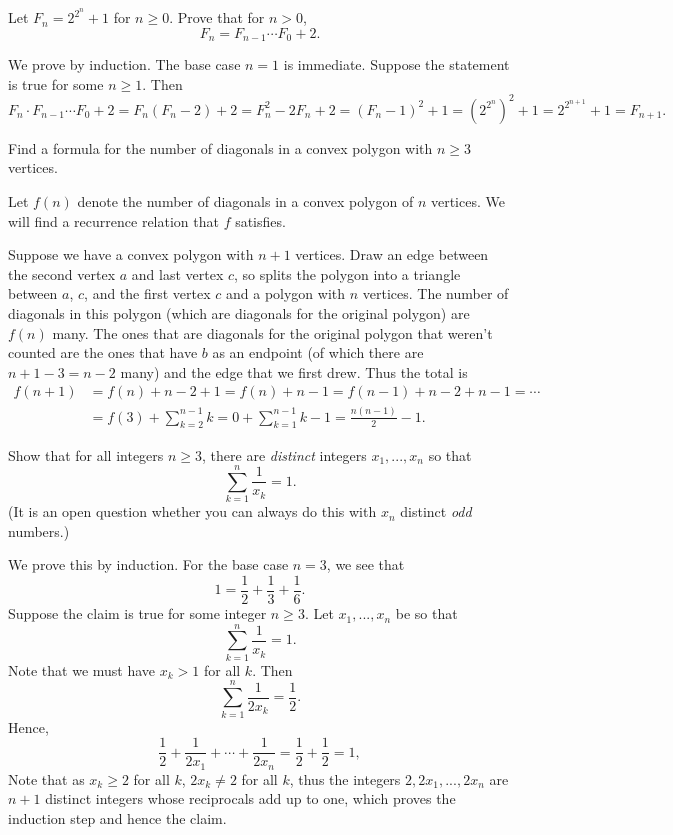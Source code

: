 \documentclass[11pt,dvipsnames]{book}
\numberwithin{equation}{section} %
\numberwithin{figure}{section} %
\numberwithin{table}{section} %
\begin{document}
\begin{exercise}
Let $F_{n}=2^{2^{n}}+1$ for $n\geq 0$. Prove that for $n>0$,
\[
F_{n} = F_{n-1}\cdots F_{0}+2.
\]
\begin{solution}
We prove by induction. The base case $n=1$ is immediate. Suppose the statement is true for some $n\geq 1$. Then
\[
F_{n}\cdot F_{n-1}\cdots F_{0}+2
= F_{n}(F_{n}-2)+2 
=F_{n}^{2}-2F_{n}+2
=(F_{n}-1)^2+1
=(2^{2^{n}})^2+1 = 2^{2^{n+1}}+1 =F_{n+1}.
\]
\end{solution}
\end{exercise}

\begin{exercise}
Find a formula for the number of diagonals in a convex polygon with $n\geq 3$ vertices. 
\begin{solution}
Let $f(n)$ denote the number of diagonals in a convex polygon of $n$ vertices. We will find a recurrence relation that $f$ satisfies. 

Suppose we have a convex  polygon with $n+1$ vertices. Draw an edge between the second vertex $a$ and last vertex $c$, so splits the polygon into a triangle between $a$, $c$, and the first vertex $c$ and a polygon with $n$ vertices. The number of diagonals in this polygon (which are diagonals for the original polygon) are $f(n)$ many. The ones that are diagonals for the original polygon that weren't counted are the ones that have $b$ as an endpoint (of which there are $n+1-3=n-2$ many) and the edge that we first drew. Thus the total is
\begin{align*}
f(n+1)
& =f(n)+n-2+1=f(n)+n-1  = f(n-1) + n-2+n-1=\cdots \\
& = f(3) + \sum_{k=2}^{n-1}k
=0+\sum_{k=1}^{n-1}k-1 = \frac{n(n-1)}{2}-1. 
\end{align*}
\end{solution}
\end{exercise}

\begin{exercise}
Show that for all integers $n\geq 3$, there are {\it distinct} integers $x_{1},...,x_{n}$ so that 
\[
\sum_{k=1}^{n} \frac{1}{x_{k}}=1.
\]
(It is an open question whether you can always do this with $x_{n}$ distinct {\it odd} numbers.)
\begin{solution}
We prove this by induction. For the base case $n=3$, we see that
\[
1=\frac{1}{2}+\frac{1}{3}+\frac{1}{6}.
\]
 Suppose the claim is true for some integer $n\geq 3$. Let $x_{1},...,x_{n}$ be so that 
\[
\sum_{k=1}^{n} \frac{1}{x_{k}}=1.
\]
Note that we must have $x_{k}>1$ for all $k$. Then 
\[
\sum_{k=1}^{n} \frac{1}{2x_{k}}=\frac{1}{2}.
\]
Hence,
\[
\frac{1}{2} + \frac{1}{2x_{1}}+\cdots + \frac{1}{2x_{n}}=\frac{1}{2}+\frac{1}{2} =1,
\]
Note that as $x_{k}\geq 2$ for all $k$, $2x_{k}\neq 2$ for all $k$, thus the integers $2,2x_{1},...,2x_{n}$ are $n+1$ distinct integers whose reciprocals add up to one, which proves the induction step and hence the claim. 
\end{solution}
\end{exercise}
\end{document}
